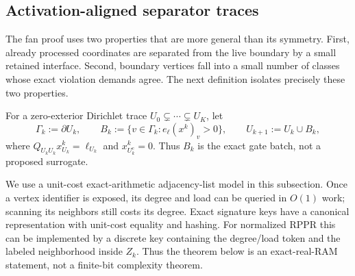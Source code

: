 \subsection{Activation-aligned separator traces}
\label{sec:activation-aligned-traces}

The fan proof uses two properties that are more general than its symmetry.
First, already processed coordinates are separated from the live boundary by
a small retained interface.  Second, boundary vertices fall into a small
number of classes whose exact violation demands agree.  The next definition
isolates precisely these two properties.

For a zero-exterior Dirichlet trace
$U_0\subsetneq\cdots\subsetneq U_K$, let
\begin{equation}
 \Gamma_k:=\partial U_k,
 \qquad
 B_k:=\{v\in\Gamma_k:e_\ell(x^k)_v>0\},
 \qquad
 U_{k+1}:=U_k\cup B_k,
 \label{eq:aligned-gate-trace}
\end{equation}
where $Q_{U_kU_k}x^k_{U_k}=\ell_{U_k}$ and
$x^k_{U_k^c}=0$.  Thus $B_k$ is the exact gate batch, not a proposed
surrogate.

We use a unit-cost exact-arithmetic adjacency-list model in this subsection.
Once a vertex identifier is exposed, its degree and load can be queried in
$O(1)$ work; scanning its neighbors still costs its degree.  Exact signature
keys have a canonical representation with unit-cost equality and hashing.
For normalized RPPR this can be implemented by a discrete key containing the
degree/load token and the labeled neighborhood inside $Z_k$.  Thus the theorem
below is an exact-real-RAM statement, not a finite-bit complexity theorem.

